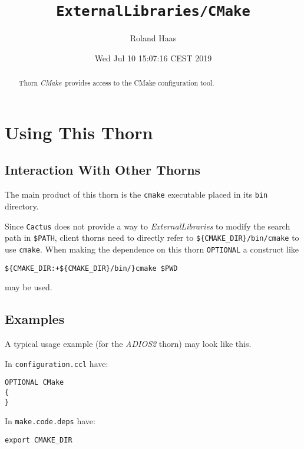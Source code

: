 \documentclass{article}
\begin{document}
\title{\tt ExternalLibraries/CMake}
\author{Roland Haas}
\date{ Wed Jul 10 15:07:16 CEST 2019 }

\maketitle


\ifx\ThisThorn\undefined
\newcommand{\ThisThorn}{{\it CMake}}
\else
\renewcommand{\ThisThorn}{{\it CMake}}
\fi

\begin{abstract}
Thorn \ThisThorn\ provides access to the CMake configuration tool.
\end{abstract}

\section{Using This Thorn}
\subsection{Interaction With Other Thorns}
The main product of this thorn is the \texttt{cmake} executable placed in its
\texttt{bin} directory.

Since \texttt{Cactus} does not provide a way to \textit{ExternalLibraries} to
modify the search path in \verb|$PATH|, client thorns need to directly refer
to \verb|${CMAKE_DIR}/bin/cmake| to use \texttt{cmake}. When making the
dependence on this thorn \verb|OPTIONAL| a construct like

\begin{verbatim}
${CMAKE_DIR:+${CMAKE_DIR}/bin/}cmake $PWD
\end{verbatim}

may be used.

\subsection{Examples}

A typical usage example (for the \textit{ADIOS2} thorn) may look like this.

In \texttt{configuration.ccl} have:

\begin{verbatim}
OPTIONAL CMake
{
}
\end{verbatim}

In \texttt{make.code.deps} have:

\begin{verbatim}
export CMAKE_DIR
\end{verbatim}
\end{document}
